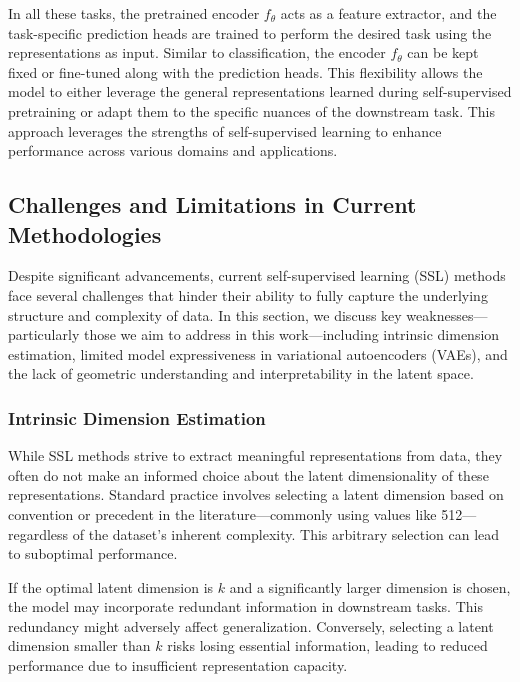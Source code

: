 In all these tasks, the pretrained encoder \( f_{\theta} \) acts as a feature extractor, and the task-specific prediction heads are trained to perform the desired task using the representations as input. Similar to classification, the encoder \( f_{\theta} \) can be kept fixed or fine-tuned along with the prediction heads. This flexibility allows the model to either leverage the general representations learned during self-supervised pretraining or adapt them to the specific nuances of the downstream task. This approach leverages the strengths of self-supervised learning to enhance performance across various domains and applications.

\subsection{Challenges and Limitations in Current Methodologies}

Despite significant advancements, current self-supervised learning (SSL) methods face several challenges that hinder their ability to fully capture the underlying structure and complexity of data. In this section, we discuss key weaknesses—particularly those we aim to address in this work—including intrinsic dimension estimation, limited model expressiveness in variational autoencoders (VAEs), and the lack of geometric understanding and interpretability in the latent space.

\subsubsection{Intrinsic Dimension Estimation}

While SSL methods strive to extract meaningful representations from data, they often do not make an informed choice about the latent dimensionality of these representations. Standard practice involves selecting a latent dimension based on convention or precedent in the literature—commonly using values like 512—regardless of the dataset's inherent complexity. This arbitrary selection can lead to suboptimal performance.

If the optimal latent dimension is \( k \) and a significantly larger dimension is chosen, the model may incorporate redundant information in downstream tasks. This redundancy might adversely affect generalization. Conversely, selecting a latent dimension smaller than \( k \) risks losing essential information, leading to reduced performance due to insufficient representation capacity.

